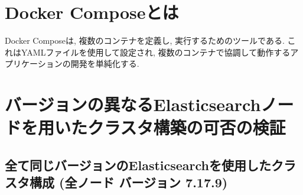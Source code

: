 \section{Docker Composeとは}
Docker Composeは, 複数のコンテナを定義し, 実行するためのツールである. これはYAMLファイルを使用して設定され, 複数のコンテナで協調して動作するアプリケーションの開発を単純化する.

\section{バージョンの異なるElasticsearchノードを用いたクラスタ構築の可否の検証}
\subsection{全て同じバージョンのElasticsearchを使用したクラスタ構成 (全ノード バージョン 7.17.9)}





